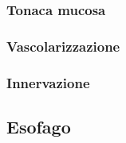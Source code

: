 \documentclass[italian,]{article}
\begin{document}
\hypertarget{tonaca-mucosa}{%
\subsubsection{Tonaca mucosa}\label{tonaca-mucosa}}

\hypertarget{vascolarizzazione-1}{%
\subsubsection{Vascolarizzazione}\label{vascolarizzazione-1}}

\hypertarget{innervazione-2}{%
\subsubsection{Innervazione}\label{innervazione-2}}

\hypertarget{esofago}{%
\subsection{Esofago}\label{esofago}}
\end{document}
